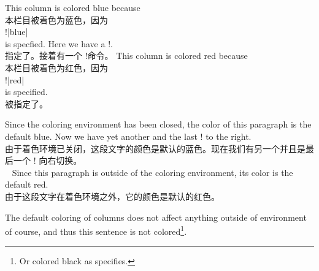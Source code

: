 \begin{description}
\begin{itemize}
\twosided[]
\begin{paracol}{2}
This column is colored blue because\\
本栏目被着色为蓝色，因为\\
\mbox{}\qquad \!\columncolor!|{blue}|\\
is specfied.  Here we have a \!\switchcolumn!.\\
指定了。接着有一个 \!\switchcolumn!命令。
\switchcolumn
{}
This column is colored red because\\
本栏目被着色为红色，因为\\
\mbox{}\qquad\!\columncolor!|{red}|\\
is specified.\\
被指定了。

%

Since the coloring environment has been closed, the color of this
paragraph is the default blue.  Now we have yet another and the last
\!\switchcolumn! to the right.\\
由于着色环境已关闭，这段文字的颜色是默认的蓝色。现在我们有另一个并且是最后一个 \!\switchcolumn! 向右切换。\\\
\switchcolumn
Since this paragraph is outside of the coloring environment, its color is
the default red.
\\由于这段文字在着色环境之外，它的颜色是默认的红色。
\end{paracol}

The default coloring of columns does not affect anything outside of
\env{paracol} environment of course, and thus this sentence is not
colored\footnote{%
Or colored black as  specifies.}.


\end{itemize}
\end{description}
